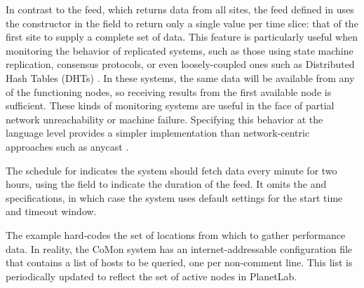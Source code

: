 In contrast to the  feed, which returns data from
all sites, the  feed defined in 
uses the  constructor in the  field to 
return only a single value per time slice: that of the first site to
supply a complete set of data.
%
%
This feature is particularly useful when monitoring the
behavior of replicated systems, such as those using
state machine replication, consensus protocols, or even
loosely-coupled ones such as Distributed Hash Tables (DHTs) 
\cite{Balakrishnan+03:dht}.
In these systems, the same data will be available from any
of the functioning nodes, so receiving results from the first
available node is sufficient. These kinds of monitoring systems
are useful in the face of partial network unreachability or
machine failure. Specifying this behavior at the language level
provides a simpler implementation than network-centric approaches such
as anycast \cite{anycast}. 

The schedule for  indicates the system should fetch data
every minute for two hours, using the  field to indicate
the duration of the feed.  It omits the  and
 specifications, in which case the system uses default
settings for the start time and timeout window.  



The  example hard-codes the set of locations from
which to gather performance data.  In reality, the CoMon system has an
internet-addressable configuration file that contains a list of hosts
to be queried, one per non-comment line. This list is periodically
updated to reflect the set of active nodes in PlanetLab. 



